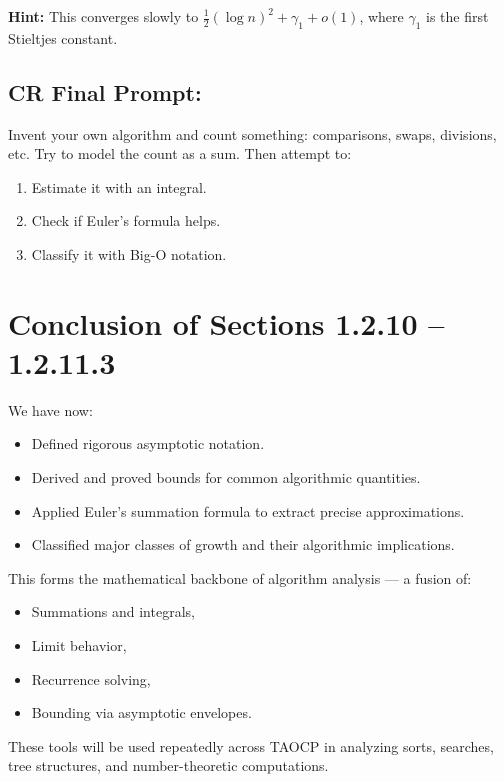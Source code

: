\documentclass{article}
\begin{document}
\textbf{Hint:} This converges slowly to $\frac{1}{2}(\log n)^2 + \gamma_1 + o(1)$, where $\gamma_1$ is the first Stieltjes constant.

\subsection*{CR Final Prompt:}

Invent your own algorithm and count something: comparisons, swaps, divisions, etc. Try to model the count as a sum. Then attempt to:
\begin{enumerate}
    \item Estimate it with an integral.
    \item Check if Euler’s formula helps.
    \item Classify it with Big-O notation.
\end{enumerate}

\section*{Conclusion of Sections 1.2.10 – 1.2.11.3}

We have now:
\begin{itemize}
    \item Defined rigorous asymptotic notation.
    \item Derived and proved bounds for common algorithmic quantities.
    \item Applied Euler’s summation formula to extract precise approximations.
    \item Classified major classes of growth and their algorithmic implications.
\end{itemize}

This forms the mathematical backbone of algorithm analysis — a fusion of:
\begin{itemize}
    \item Summations and integrals,
    \item Limit behavior,
    \item Recurrence solving,
    \item Bounding via asymptotic envelopes.
\end{itemize}

These tools will be used repeatedly across TAOCP in analyzing sorts, searches, tree structures, and number-theoretic computations.
\end{document}
